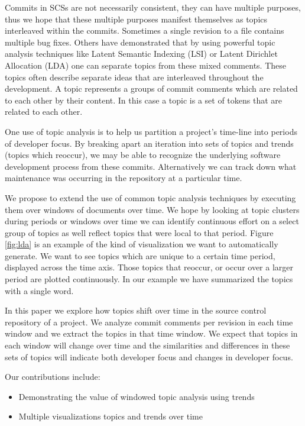 \documentclass[times, 10pt,twocolumn]{article}
\begin{document}
Commits in SCSs are not necessarily consistent, they can have multiple
purposes, thus we hope that these multiple purposes manifest themselves as
topics interleaved within the commits.  Sometimes a single revision to
a file contains multiple bug fixes.  Others have demonstrated that by
using powerful topic analysis techniques like Latent Semantic Indexing
(LSI) or Latent Dirichlet Allocation (LDA) one can separate topics
from these mixed comments. These topics often describe separate ideas
that are interleaved throughout the development. A topic represents a
groups of commit comments which are related to each other by their
content.  In this case a topic is a set of tokens that are related to
each other.


One use of topic analysis is to help us partition a project's
time-line into periods of developer focus. By breaking apart an
iteration into sets of topics and trends (topics which reoccur), we
may be able to recognize the underlying software development process
from these commits. Alternatively we can track down what maintenance was
occurring in the repository at a particular time.

We propose to extend the use of common topic analysis techniques by
executing them over windows of documents over time. We hope by looking
at topic clusters during periods or windows over time we can identify
continuous effort on a select group of topics as well reflect topics
that were local to that period. Figure \ref{fig:lda} is an example of
the kind of visualization we want to automatically generate. We want
to see topics which are unique to a certain time period, displayed
across the time axis. Those topics that reoccur, or occur over a
larger period are plotted continuously. In our example we have
summarized the topics with a single word.

In this paper we explore how topics shift over time in the
source control repository of a project. We analyze commit comments per
revision in each time window and we extract the topics in that time
window. We expect that topics in each window will change over time and
the similarities and differences in these sets of topics will indicate
both developer focus and changes in developer focus.

Our contributions include:
\begin{itemize}
\item Demonstrating the value of windowed topic analysis using trends
\item Multiple visualizations topics and trends over time
\end{itemize}
\end{document}
